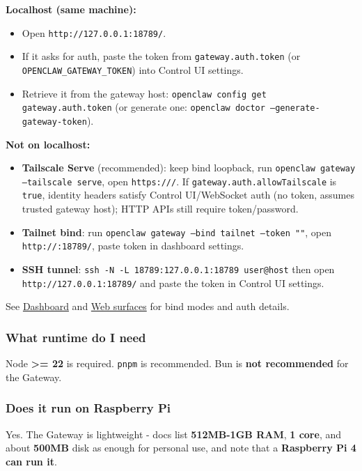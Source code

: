 \textbf{Localhost (same machine):}

\begin{itemize}
  \item Open \texttt{http://127.0.0.1:18789/}.
  \item If it asks for auth, paste the token from \texttt{gateway.auth.token} (or \texttt{OPENCLAW\_GATEWAY\_TOKEN}) into Control UI settings.
  \item Retrieve it from the gateway host: \texttt{openclaw config get gateway.auth.token} (or generate one: \texttt{openclaw doctor --generate-gateway-token}).
\end{itemize}


\textbf{Not on localhost:}

\begin{itemize}
  \item \textbf{Tailscale Serve} (recommended): keep bind loopback, run \texttt{openclaw gateway --tailscale serve}, open \texttt{https:///}. If \texttt{gateway.auth.allowTailscale} is \texttt{true}, identity headers satisfy Control UI/WebSocket auth (no token, assumes trusted gateway host); HTTP APIs still require token/password.
  \item \textbf{Tailnet bind}: run \texttt{openclaw gateway --bind tailnet --token ""}, open \texttt{http://:18789/}, paste token in dashboard settings.
  \item \textbf{SSH tunnel}: \texttt{ssh -N -L 18789:127.0.0.1:18789 user@host} then open \texttt{http://127.0.0.1:18789/} and paste the token in Control UI settings.
\end{itemize}


See \href{/web/dashboard}{Dashboard} and \href{/web}{Web surfaces} for bind modes and auth details.

\subsubsection{What runtime do I need}


Node \textbf{>= 22} is required. \texttt{pnpm} is recommended. Bun is \textbf{not recommended} for the Gateway.

\subsubsection{Does it run on Raspberry Pi}


Yes. The Gateway is lightweight - docs list \textbf{512MB-1GB RAM}, \textbf{1 core}, and about \textbf{500MB}
disk as enough for personal use, and note that a \textbf{Raspberry Pi 4 can run it}.

